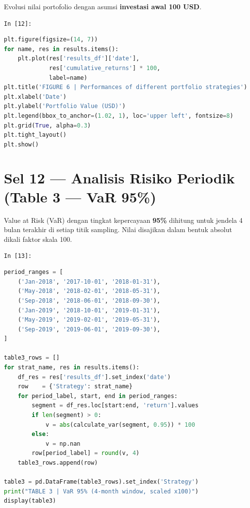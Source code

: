 \documentclass[12pt,a4paper]{article}
\newcommand{\cellIn}[1]{%
  \begin{tcolorbox}[cellheader]
    \texttt{In [#1]:}
  \end{tcolorbox}\vspace{-6pt}%
}
\begin{document}
Evolusi nilai portofolio dengan asumsi \textbf{investasi awal 100 USD}.

\cellIn{12}
\begin{tcolorbox}[codebox]
\begin{lstlisting}[language=Python, numbers=none]
plt.figure(figsize=(14, 7))
for name, res in results.items():
    plt.plot(res['results_df']['date'],
             res['cumulative_returns'] * 100,
             label=name)
plt.title('FIGURE 6 | Performances of different portfolio strategies')
plt.xlabel('Date')
plt.ylabel('Portfolio Value (USD)')
plt.legend(bbox_to_anchor=(1.02, 1), loc='upper left', fontsize=8)
plt.grid(True, alpha=0.3)
plt.tight_layout()
plt.show()
\end{lstlisting}
\end{tcolorbox}

\section{Sel 12 --- Analisis Risiko Periodik (Table 3 --- VaR 95\%)}

Value at Risk (VaR) dengan tingkat kepercayaan \textbf{95\%} dihitung untuk
jendela 4 bulan terakhir di setiap titik sampling. Nilai disajikan dalam bentuk
absolut dikali faktor skala 100.

\cellIn{13}
\begin{tcolorbox}[codebox]
\begin{lstlisting}[language=Python, numbers=none]
period_ranges = [
    ('Jan-2018', '2017-10-01', '2018-01-31'),
    ('May-2018', '2018-02-01', '2018-05-31'),
    ('Sep-2018', '2018-06-01', '2018-09-30'),
    ('Jan-2019', '2018-10-01', '2019-01-31'),
    ('May-2019', '2019-02-01', '2019-05-31'),
    ('Sep-2019', '2019-06-01', '2019-09-30'),
]

table3_rows = []
for strat_name, res in results.items():
    df_res = res['results_df'].set_index('date')
    row    = {'Strategy': strat_name}
    for period_label, start, end in period_ranges:
        segment = df_res.loc[start:end, 'return'].values
        if len(segment) > 0:
            v = abs(calculate_var(segment, 0.95)) * 100
        else:
            v = np.nan
        row[period_label] = round(v, 4)
    table3_rows.append(row)

table3 = pd.DataFrame(table3_rows).set_index('Strategy')
print("TABLE 3 | VaR 95% (4-month window, scaled x100)")
display(table3)
\end{lstlisting}
\end{tcolorbox}
\end{document}
